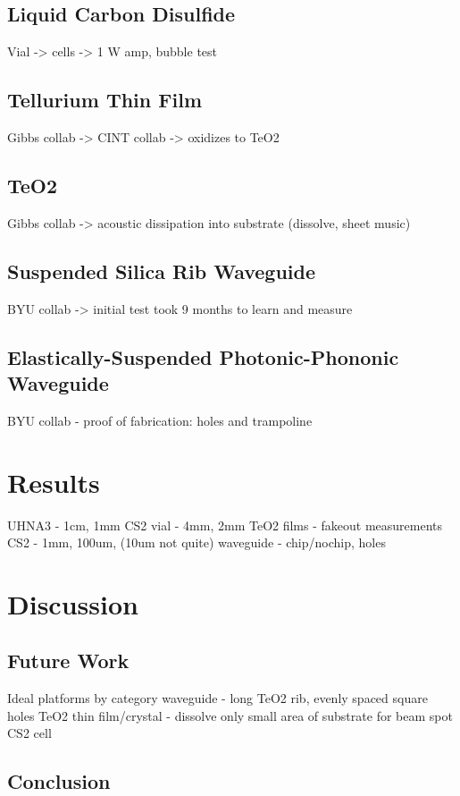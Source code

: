 \subsection{Liquid Carbon Disulfide}
\label{subsec:Raman:Target:CS2}
Vial -> cells -> 1 W amp, bubble test

\subsection{Tellurium Thin Film}
\label{subsec:Raman:Target:Te}
Gibbs collab -> CINT collab -> oxidizes to TeO2

\subsection{TeO2}
\label{subsec:Raman:Target:TeO2}
Gibbs collab -> acoustic dissipation into substrate (dissolve, sheet music)

\subsection{Suspended Silica Rib Waveguide}
\label{subsec:Raman:Target:Waveguide}
BYU collab -> initial test took 9 months to learn and measure

\subsection{Elastically-Suspended Photonic-Phononic Waveguide}
\label{subsec:Raman:Target:WigglyWaveguide}
BYU collab - proof of fabrication: holes and trampoline


\section{Results}
\label{sec:Raman:Results}

UHNA3 - 1cm, 1mm
CS2 vial - 4mm, 2mm
TeO2 films - fakeout measurements
CS2 - 1mm, 100um, (10um not quite)
waveguide - chip/nochip, holes


\section{Discussion}
\label{sec:Raman:Discussion}

\subsection{Future Work}
\label{subsec:Raman:FutureWork}
Ideal platforms by category
  waveguide - long TeO2 rib, evenly spaced square holes
  TeO2 thin film/crystal - dissolve only small area of substrate for beam spot
  CS2 cell

\subsection{Conclusion}
\label{subsec:Raman:Conclusion}


\clearpage
\thispagestyle{empty}
\null
\newpage
